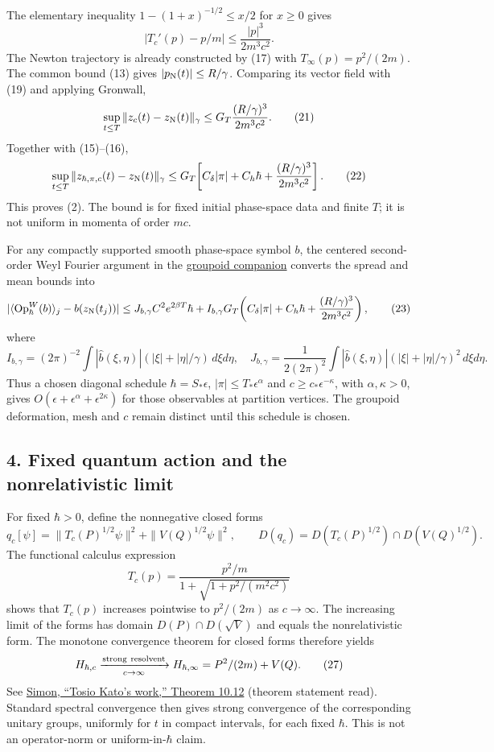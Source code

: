 \documentclass[11pt,a4paper]{article}
\begin{document}
The elementary inequality \(1-(1+x)^{-1/2}\le x/2\) for \(x\ge0\) gives
\[|T_c'(p)-p/m|\le\frac{|p|^3}{2m^3c^2}.\tag{20}\] The Newton trajectory
is already constructed by (17) with \(T_\infty(p)=p^2/(2m)\). The common
bound (13) gives \(|p_{\rm N}(t)|\le R/\gamma\). Comparing its vector
field with (19) and applying Gronwall, \[
 \sup_{t\le T}\|z_c(t)-z_{\rm N}(t)\|_\gamma
 \le G_T\frac{(R/\gamma)^3}{2m^3c^2}.\tag{21}
\] Together with (15)--(16), \[
 \sup_{t\le T}\|z_{\hbar,\pi,c}(t)-z_{\rm N}(t)\|_\gamma
 \le G_T\!\left[
 C_\delta|\pi|+C_h\hbar
 +\frac{(R/\gamma)^3}{2m^3c^2}\right].\tag{22}
\] This proves (2). The bound is for fixed initial phase-space data and
finite \(T\); it is not uniform in momenta of order \(mc\).

For any compactly supported smooth phase-space symbol \(b\), the
centered second-order Weyl Fourier argument in the
\href{groupoid-quantum-newton-states.md}{groupoid companion} converts
the spread and mean bounds into \[
 |\langle\operatorname{Op}_\hbar^W(b)\rangle_j-b(z_{\rm N}(t_j))|
 \le J_{b,\gamma}C^2e^{2\beta T}\hbar+
 I_{b,\gamma}G_T\!\left(
 C_\delta|\pi|+C_h\hbar
 +\frac{(R/\gamma)^3}{2m^3c^2}\right),\tag{23}
\] where \[I_{b,\gamma}=(2\pi)^{-2}\int|\widehat b(\xi,\eta)|
            (|\xi|+|\eta|/\gamma)\,d\xi d\eta,\quad
 J_{b,\gamma}=\frac1{2(2\pi)^2}\int|\widehat b(\xi,\eta)|
            (|\xi|+|\eta|/\gamma)^2\,d\xi d\eta.\tag{24}\] Thus a chosen
diagonal schedule \(\hbar=S_*\epsilon\), \(|\pi|\le T_*\epsilon^\alpha\)
and \(c\ge c_*\epsilon^{-\kappa}\), with \(\alpha,\kappa>0\), gives
\(O(\epsilon+\epsilon^\alpha+\epsilon^{2\kappa})\) for those observables
at partition vertices. The groupoid deformation, mesh and \(c\) remain
distinct until this schedule is chosen.

\hypertarget{fixed-quantum-action-and-the-nonrelativistic-limit}{%
\subsection{4. Fixed quantum action and the nonrelativistic
limit}\label{fixed-quantum-action-and-the-nonrelativistic-limit}}

For fixed \(\hbar>0\), define the nonnegative closed forms \[
 q_c[\psi]=\|T_c(P)^{1/2}\psi\|^2
            +\|V(Q)^{1/2}\psi\|^2,\qquad
 D(q_c)=D(T_c(P)^{1/2})\cap D(V(Q)^{1/2}).\tag{25}
\] The functional calculus expression
\[T_c(p)=\frac{p^2/m}{1+\sqrt{1+p^2/(m^2c^2)}}\tag{26}\] shows that
\(T_c(p)\) increases pointwise to \(p^2/(2m)\) as \(c\to\infty\). The
increasing limit of the forms has domain \(D(P)\cap D(\sqrt V)\) and
equals the nonrelativistic form. The monotone convergence theorem for
closed forms therefore yields
\[H_{\hbar,c}\xrightarrow[c\to\infty]{\rm strong\ resolvent}
 H_{\hbar,\infty}=P^2/(2m)+V(Q).\tag{27}\] See
\href{https://link.springer.com/article/10.1007/s13373-018-0118-0}{Simon,
``Tosio Kato's work,'' Theorem 10.12} (theorem statement read). Standard
spectral convergence then gives strong convergence of the corresponding
unitary groups, uniformly for \(t\) in compact intervals, for each fixed
\(\hbar\). This is not an operator-norm or uniform-in-\(\hbar\) claim.
\end{document}
